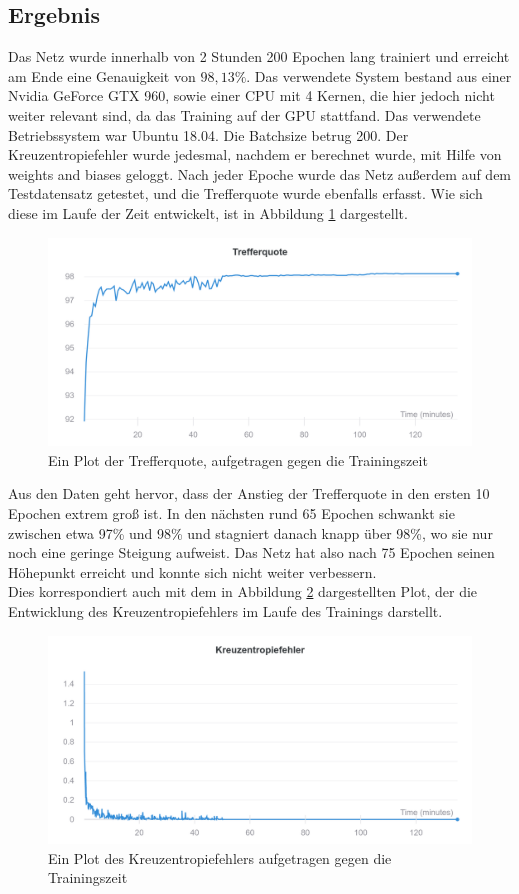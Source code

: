 \documentclass[11pt]{article}
\begin{document}
\subsection{Ergebnis}
Das Netz wurde innerhalb von 2 Stunden 200 Epochen lang trainiert und erreicht am Ende eine Genauigkeit von $98,13\%$. Das verwendete System bestand aus einer Nvidia GeForce GTX 960, sowie einer CPU mit 4 Kernen, die hier jedoch nicht weiter relevant sind, da das Training auf der GPU stattfand. Das verwendete Betriebssystem war Ubuntu 18.04. Die Batchsize betrug 200. Der Kreuzentropiefehler wurde jedesmal, nachdem er berechnet wurde, mit Hilfe von weights and biases geloggt. Nach jeder Epoche wurde das Netz außerdem auf dem Testdatensatz getestet, und die Trefferquote wurde ebenfalls erfasst. Wie sich diese im Laufe der Zeit entwickelt, ist in Abbildung \ref{accuracy} dargestellt.
\newpage
\begin{figure}[h]
	\includegraphics[width=0.9\linewidth]{../graphics/Wandb_accuracy.png}
	\caption{Ein Plot der Trefferquote, aufgetragen gegen die Trainingszeit}
	\label{accuracy}
\end{figure}
Aus den Daten geht hervor, dass der Anstieg der Trefferquote in den ersten 10 Epochen extrem groß ist. In den nächsten rund 65 Epochen schwankt sie zwischen etwa 97\% und 98\% und stagniert danach knapp über 98\%, wo sie nur noch eine geringe Steigung aufweist. Das Netz hat also nach 75 Epochen seinen Höhepunkt erreicht und konnte sich nicht weiter verbessern.\\
Dies korrespondiert auch mit dem in Abbildung \ref{loss} dargestellten Plot, der die Entwicklung des Kreuzentropiefehlers im Laufe des Trainings darstellt.
\begin{figure}[h]
	\begin{center}
	\includegraphics[width=0.9\linewidth]{../graphics/Wandb_loss.png}
	\end{center}
	\caption{Ein Plot des Kreuzentropiefehlers aufgetragen gegen die Trainingszeit}
	\label{loss}
\end{figure}
\end{document}
